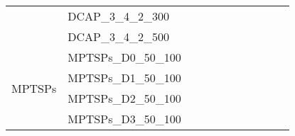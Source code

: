 \begin{table}[]
{\begin{tabular}{|c|l|ll|ll|ll|l|l|l|}
			& DCAP\_3\_4\_2\_300            &                                   &                                  &                           &                          &                           &                          &                                       &                               & \\
			& DCAP\_3\_4\_2\_500            &                                   &                                  &                           &                          &                           &                          &                                       &                               & \\
\hline
			\multirow{4}{*}{MPTSPs} & MPTSPs\_D0\_50\_100           &                                   &                                  &                           &                          &                           &                          &                                       &                               & \\
			& MPTSPs\_D1\_50\_100           &                                   &                                  &                           &                          &                           &                          &                                       &                               & \\
			& MPTSPs\_D2\_50\_100           &                                   &                                  &                           &                          &                           &                          &                                       &                               & \\
			& MPTSPs\_D3\_50\_100           &                                   &                                  &                           &                          &                           &                          &                                       &                               & \\

\end{tabular}}
\end{table}
